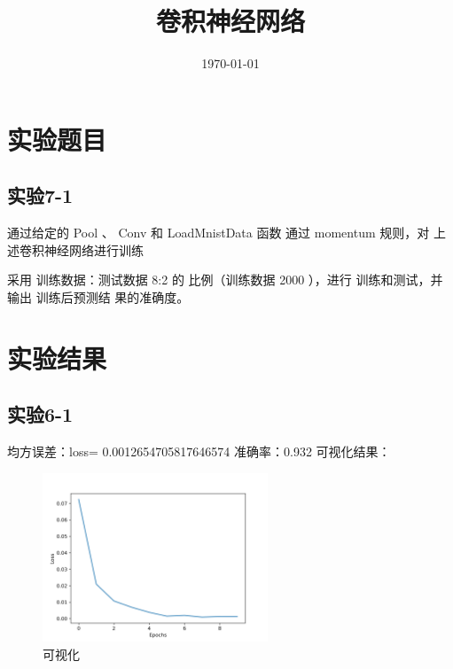 \documentclass{../source/Experiment}
\title{卷积神经网络}
\date{\today}
\begin{document}
    \makecover
    \section{实验题目}
        \subsection{实验7-1}
        通过给定的 Pool 、 Conv 和 LoadMnistData 函数
        通过 momentum 规则，对 上述卷积神经网络进行训练
        
        采用 训练数据：测试数据 8:2 的 比例（训练数据
        2000 ），进行 训练和测试，并 输出 训练后预测结
        果的准确度。  

    \section{实验结果}
        \subsection{实验6-1}
            均方误差：loss= 0.0012654705817646574
            准确率：0.932
            可视化结果：
            \begin{figure}[H]
                \centering
                \includegraphics[width = 0.6\textwidth]{Part7/lab10_by_zyl/lab7_1.png}
                \caption{可视化}
            \end{figure}
\end{document}
